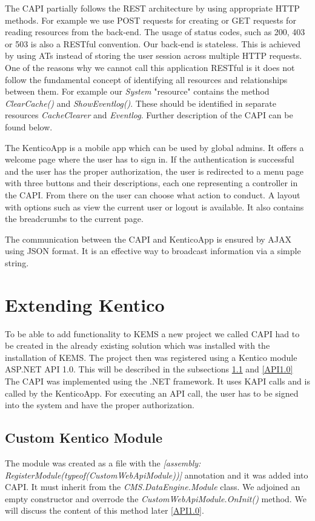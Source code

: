 The CAPI partially follows the REST architecture by using appropriate HTTP methods. For example we use POST requests for creating or GET requests for reading resources from the back-end. The usage of status codes, such as 200, 403 or 503 is also a RESTful convention. Our back-end is stateless. This is achieved by using ATs instead of storing the user session across multiple HTTP requests. One of the reasons why we cannot call this application RESTful is it does not follow the fundamental concept of identifying all resources and relationships between them. For example our \textit{System} "resource" contains the method \textit{ClearCache()} and \textit{ShowEventlog()}. These should be identified in separate resources \textit{CacheClearer} and \textit{Eventlog}. Further description of the CAPI can be found below.

The KenticoApp is a mobile app which can be used by global admins. It offers a welcome page where the user has to sign in. If the authentication is successful and the user has the proper authorization, the user is redirected to a menu page with three buttons and their descriptions, each one representing a controller in the CAPI. From there on the user can choose what action to conduct. A layout with options such as view the current user or logout is available. It also contains the breadcrumbs to the current page. 

The communication between the CAPI and KenticoApp is ensured by AJAX using JSON format. It is an effective way to broadcast information via a simple string.

\section{Extending Kentico} \label{implExtendingKentico}
To be able to add functionality to KEMS a new project we called CAPI had to be created in the already existing solution which was installed with the installation of KEMS. The  project then was registered using a Kentico module ASP.NET API 1.0. This will be described in the subsections \ref{cutomModule} and \ref{API1.0}
The CAPI was implemented using the .NET framework. It uses KAPI calls and is called by the KenticoApp. For executing an API call, the user has to be signed into the system and have the proper authorization. 
\subsection{Custom Kentico Module} \label{cutomModule}
The module was created as a file with the \textit{[assembly: RegisterModule(typeof(CustomWebApiModule))]} annotation and it was added into CAPI. It must inherit from the \textit{CMS.DataEngine.Module} class. We adjoined an empty constructor and overrode the \textit{CustomWebApiModule.OnInit()} method. We will discuss the content of this method later \ref{API1.0}. 
